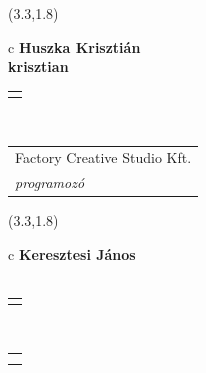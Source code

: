 \documentclass[11pt]{article}
\begin{document}
\makebox(3.3,1.8){
  \renewcommand\arraystretch{1.3}
  \begin{tabular}[c]{c}
    \hspace{8.5mm}
    \LARGE\bf{ Huszka Krisztián }\\
    \hspace{8.5mm}
    \Large{ krisztian }\\
    \renewcommand\arraystretch{3}
    \begin{tabular}[c]{c}
      \centering
      \fontfamily{phv}\selectfont{
        \textbf{
          \textsc{
            \scriptsize{
            \color{Bright}{ Ismerkedő }\color{Bright}{ Webmester }\color{Bright}{ Sminkmester }\color{Dark}{ Programozó }
            }
          }
        }
      }
    \end{tabular}
    \\
    \renewcommand\arraystretch{1}
    \begin{tabular}{p{3.3in}}
      \hspace{.7cm}Factory Creative Studio Kft.\\
      \hspace{.7cm}\emph{ programozó }\\
    \end{tabular}
  \end{tabular}
}

\makebox(3.3,1.8){
  \renewcommand\arraystretch{1.3}
  \begin{tabular}[c]{c}
    \hspace{8.5mm}
    \LARGE\bf{ Keresztesi János }\\
    \hspace{8.5mm}
    \Large{  }\\
    \renewcommand\arraystretch{3}
    \begin{tabular}[c]{c}
      \centering
      \fontfamily{phv}\selectfont{
        \textbf{
          \textsc{
            \scriptsize{
            \color{Dark}{ Ismerkedő }\color{Bright}{ Webmester }\color{Bright}{ Sminkmester }\color{Bright}{ Programozó }
            }
          }
        }
      }
    \end{tabular}
    \\
    \renewcommand\arraystretch{1}
    \begin{tabular}{p{3.3in}}
      \hspace{.7cm}\\
      \hspace{.7cm}\emph{  }\\
    \end{tabular}
  \end{tabular}
}
\end{document}

